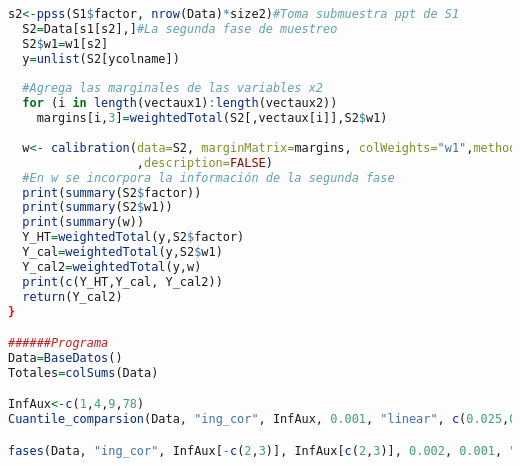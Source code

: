 \documentclass[a4paper,twoside,openright,12pt]{book}
\theoremstyle{definition}
\numberwithin{equation}{chapter}
\numberwithin{figure}{chapter}
\numberwithin{table}{chapter}
\numberwithin{theorem}{chapter}
\numberwithin{lemma}{chapter}
\begin{document}
\begin{lstlisting}[language=R]
  s2<-ppss(S1$factor, nrow(Data)*size2)#Toma submuestra ppt de S1 
  S2=Data[s1[s2],]#La segunda fase de muestreo
  S2$w1=w1[s2]
  y=unlist(S2[ycolname])
  
  #Agrega las marginales de las variables x2
  for (i in length(vectaux1):length(vectaux2))
    margins[i,3]=weightedTotal(S2[,vectaux[i]],S2$w1)
  
  w<- calibration(data=S2, marginMatrix=margins, colWeights="w1",method=mtd
                  ,description=FALSE)
  #En w se incorpora la información de la segunda fase
  print(summary(S2$factor))
  print(summary(S2$w1))
  print(summary(w))  
  Y_HT=weightedTotal(y,S2$factor)
  Y_cal=weightedTotal(y,S2$w1)
  Y_cal2=weightedTotal(y,w)
  print(c(Y_HT,Y_cal, Y_cal2))
  return(Y_cal2)
}

######Programa
Data=BaseDatos()
Totales=colSums(Data)

InfAux<-c(1,4,9,78)
Cuantile_comparsion(Data, "ing_cor", InfAux, 0.001, "linear", c(0.025,0.5,0.975))

fases(Data, "ing_cor", InfAux[-c(2,3)], InfAux[c(2,3)], 0.002, 0.001, "linear")

\end{lstlisting}


\hypertarget{bib}{}


\end{document}
